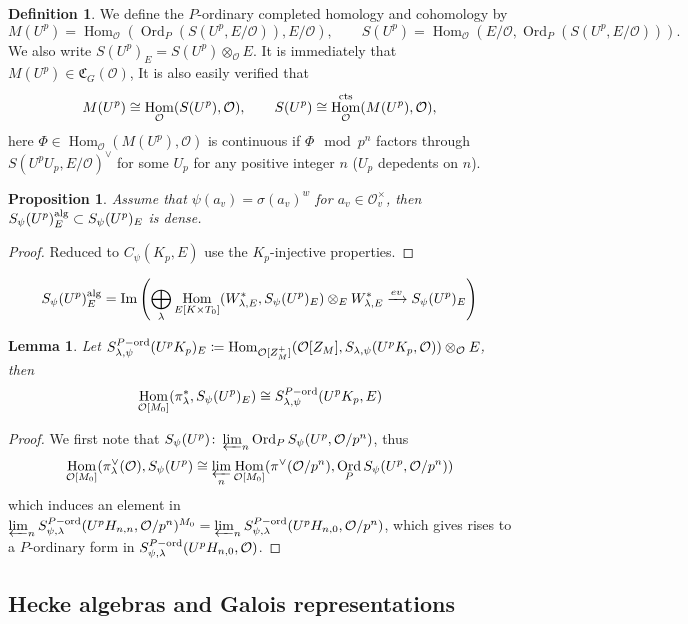 \documentclass[leqno]{amsart}
\newcommand{\fC}{\mathfrak C}
\DeclareMathOperator{\Ord}{Ord}
\newcommand{\cts}{\textnormal{cts}}
\newcommand{\alg}{\textnormal{alg}}
\newcommand{\ord}{\textnormal{ord}}
\newcommand{\oo}{\mathcal{O}} %
\DeclareMathOperator{\Hom}{Hom}
\DeclareMathOperator{\Image}{Im}
\newtheorem{lem}[thm]{Lemma}
\newtheorem{prop}[thm]{Proposition}
\theoremstyle{definition}
\newtheorem{defn}[thm]{Definition}
\theoremstyle{remark}
\begin{document}
\begin{defn}
	We define the $P$-ordinary completed homology and cohomology by
	\begin{equation*}
		M(U^p)=\Hom_\oo(\Ord_P(S(U^p,E/\oo)),E/\oo),\qquad
		S(U^p)=\Hom_\oo(E/\oo, \Ord_P(S(U^p,E/\oo))).
	\end{equation*}
	We also write $S(U^p)_E=S(U^p)\otimes_\oo E$.
	It is immediately that 
	$M(U^p)\in \fC_{G}(\oo)$,
	It is also easily verified that 
	\[
		M(U^p)\cong \Hom_\oo(S(U^p),\oo),\qquad
		S(U^p)\cong \Hom_\oo^{\cts}(M(U^p),\oo),
	\]
	here $\Phi\in \Hom_\oo(M(U^p),\oo)$ 
	is continuous if 
	$\Phi \mod p^n$ factors through
	$S(U^pU_p,E/\oo)^\vee$ for some $U_p$
	for any positive integer $n$
	($U_p$ depedents on  $n$).
\end{defn}

\begin{prop}
Assume that $\psi(a_v)=\sigma(a_v)^w$
for  $a_v\in \oo_v^\times$,
then $S_\psi(U^p)_E^{\alg}\subset S_\psi(U^p)_E$
is dense.
\end{prop}
\begin{proof}
	Reduced to $C_\psi(K_p,E)$ use the  $K_p$-injective properties.
\end{proof}
\[
S_\psi(U^p)_E^{\alg}=
\Image\left(
	\bigoplus_{\lambda}\Hom_{E[K\times T_0]}(W_{\lambda,E}^*, 
	S_\psi(U^p)_E)
	\otimes_EW_{\lambda,E}^*\xrightarrow{ev}
	S_\psi(U^p)_E
\right)
\]

\begin{lem}
	Let $S_{\lambda,\psi}^{P-\ord}(U^pK_p)_E
	\coloneqq \Hom_{\oo[Z_M^+]}
	(\oo[Z_M], S_{\lambda,\psi}(U^pK_p,\oo))\otimes_\oo E$,
	then
	\[
		\Hom_{\oo[M_0]}(\pi_\lambda^*, S_\psi(U^p)_E)\cong
		S_{\lambda,\psi}^{P-\ord}(U^pK_p,E)
	\]
\end{lem}
\begin{proof}
	We first note that 
	$S_\psi(U^p)\colon \varprojlim_{n}\Ord_PS_\psi(U^p, \oo/p^n)$,
	thus 
	\[
		\Hom_{\oo[M_0]}(\pi_\lambda^\vee(\oo),S_\psi(U^p)\cong
		\varprojlim_{n}\Hom_{\oo[M_0]}(\pi^\vee(\oo/p^n),
		\Ord_PS_\psi(U^p,\oo/p^n))
	\]
	which induces an element in 
	$\varprojlim_n S_{\psi,\lambda}^{P-\ord}(U^pH_{n,n},\oo/p^n)^{M_0}
	=\varprojlim_n S_{\psi,\lambda}^{P-\ord}(U^pH_{n,0},\oo/p^n)$,
	which gives rises to a $P$-ordinary form in 
	$S_{\psi,\lambda}^{P-\ord}(U^pH_{n,0},\oo)$.
\end{proof}



\subsection{Hecke algebras and Galois representations}
\end{document}
